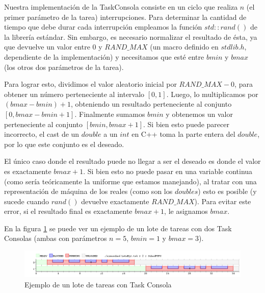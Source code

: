 
Nuestra implementaci\'on de la TaskConsola consiste en un ciclo que realiza $n$ (el primer par\'ametro de la tarea) interrupciones. 
Para determinar la cantidad de tiempo que debe durar cada interrupci\'on empleamos la funci\'on $std::rand()$ de la librer\'ia est\'andar. 
Sin embargo, es necesario normalizar el resultado de \'esta, ya que devuelve un valor entre $0$ y $RAND\_MAX$ (un macro definido en $stdlib.h$, dependiente de la implementación) y necesitamos que est\'e entre $bmin$ y $bmax$ (los otros dos par\'ametros de la tarea).

Para lograr esto, dividimos el valor aleatorio inicial por $RAND\_MAX - 0$, para obtener un n\'umero perteneciente al intervalo $[0, 1]$.
Luego, lo multiplicamos por $(bmax - bmin)+1$, obteniendo un resultado perteneciente al conjunto $[0, bmax - bmin + 1]$.
Finalmente sumamos $bmin$ y obtenemos un valor perteneciente al conjunto $[bmin, bmax + 1]$.
Si bien esto puede parecer incorrecto, el cast de un $double$ a un $int$ en C++ toma la parte entera del $double$, por lo que este conjunto es el deseado. 

El \'unico caso donde el resultado puede no llegar a ser el deseado es donde el valor es exactamente $bmax + 1$. 
Si bien esto no puede pasar en una variable continua (como ser\'ia te\'oricamente la uniforme que estamos manejando), al tratar con una representaci\'on de m\'aquina de los reales (como son los $doubles$) esto es posible (y sucede cuando $rand()$ devuelve exactamente $RAND\_MAX$).
Para evitar este error, si el resultado final es exactamente $bmax + 1$, le asignamos $bmax$.

En la figura \ref{fig:figuraEj1} se puede ver un ejemplo de un lote de tareas con dos Task Consolas (ambas con par\'ametros $n = 5$, $bmin = 1$ y $bmax = 3$).

\begin{figure}[H]
\caption{Ejemplo de un lote de tareas con Task Consola}
\label{fig:figuraEj1}
\includegraphics[width=1\textwidth]{imgs/imgEj1.png}
\end{figure}

